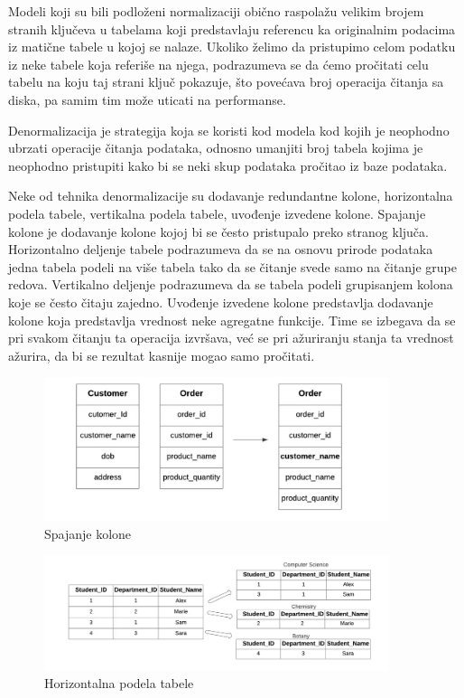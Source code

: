 \documentclass[12pt,oneside]{memoir}
\begin{document}
Modeli koji su bili podloženi normalizaciji obično raspolažu velikim brojem stranih ključeva u tabelama koji predstavlaju referencu ka originalnim podacima iz matične tabele u kojoj se nalaze. Ukoliko želimo da pristupimo celom podatku iz neke tabele koja referiše na njega, podrazumeva se da ćemo pročitati celu tabelu na koju taj strani ključ pokazuje, što povećava broj operacija čitanja sa diska, pa samim tim može uticati na performanse.

Denormalizacija je strategija koja se koristi kod modela kod kojih je neophodno ubrzati operacije čitanja podataka, odnosno umanjiti broj tabela kojima je neophodno pristupiti kako bi se neki skup podataka pročitao iz baze podataka.  

Neke od tehnika denormalizacije su dodavanje redundantne kolone, horizontalna podela tabele, vertikalna podela tabele, uvođenje izvedene kolone. 
Spajanje kolone je dodavanje kolone kojoj bi se često pristupalo preko stranog ključa.
Horizontalno deljenje tabele podrazumeva da se na osnovu prirode podataka jedna tabela podeli na više tabela tako da se čitanje svede samo na čitanje grupe redova. 
Vertikalno deljenje podrazumeva da se tabela podeli grupisanjem kolona koje se često čitaju zajedno. 
Uvođenje izvedene kolone predstavlja dodavanje kolone koja predstavlja vrednost neke agregatne funkcije. Time se izbegava da se pri svakom čitanju ta operacija izvršava, već se pri ažuriranju stanja ta vrednost ažurira, da bi se rezultat kasnije mogao samo pročitati.


\begin{figure}[!ht]
  \centering
  \includegraphics[width=0.9\textwidth]{denormalizacija.png}
  \caption{Spajanje kolone}
  \label{fig:grafikon}
\end{figure}

\begin{figure}[!ht]
  \centering
  \includegraphics[width=0.9\textwidth]{denormalizacija2.png}
  \caption{Horizontalna podela tabele}
  \label{fig:grafikon}
\end{figure}
\end{document}
